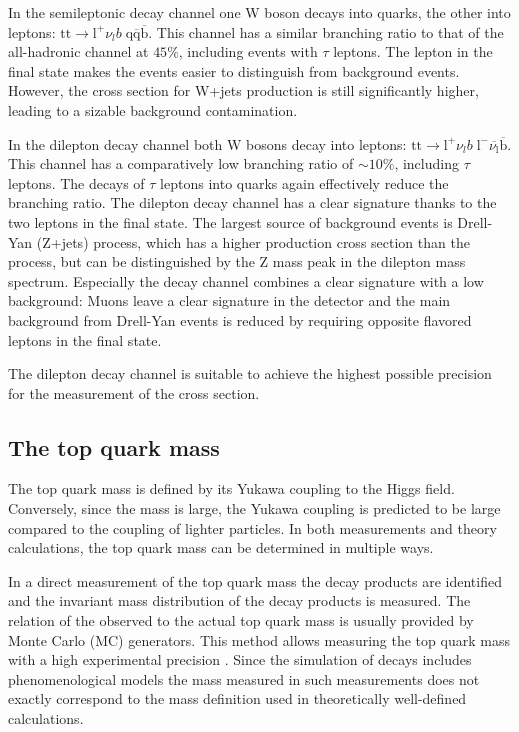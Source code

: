 In the semileptonic decay channel one W boson decays into quarks, the other into leptons: $\mathrm{tt} \rightarrow \mathrm{l}^+ \nu_l b \; \mathrm{q}\overline{\mathrm{q}}\overline{\mathrm{b}}$. This channel has a similar branching ratio to that of the all-hadronic channel at $45\%$, including events with $\tau$ leptons. 
The lepton in the final state makes the events easier to distinguish from background events. However, the cross section for W+jets production is still significantly higher, leading to a sizable background contamination.

In the dilepton decay channel both W bosons decay into leptons: $\mathrm{tt} \rightarrow \mathrm{l}^+ \nu_l b \; \mathrm{l}^- \overline{\nu_\mathrm{l}}\overline{\mathrm{b}}$. This channel has a comparatively low branching ratio of $\sim 10\%$, including $\tau$ leptons. The decays of $\tau$ leptons into quarks again effectively reduce the branching ratio.
The dilepton decay channel has a clear signature thanks to the two leptons in the final state. The largest source of background events is Drell-Yan (Z+jets) process, which has a higher production cross section than the \ttbar process, but can be distinguished by the Z mass peak in the dilepton mass spectrum.
Especially the \emu decay channel combines a clear signature with a low background: Muons leave a clear signature in the detector and the main background from Drell-Yan events is reduced by requiring opposite flavored leptons in the final state.

The dilepton decay channel is suitable to achieve the highest possible precision for the measurement of the \ttbar cross section.

\subsection{The top quark mass}

The top quark mass is defined by its Yukawa coupling to the Higgs field. Conversely, since the mass is large, the Yukawa coupling is predicted to be large compared to the coupling of lighter particles.
In both measurements and theory calculations, the top quark mass can be determined in multiple ways.

In a direct measurement of the top quark mass the decay products are identified and the invariant mass distribution of the decay products is measured. The relation of the observed to the actual top quark mass is usually provided by Monte Carlo (MC) generators.
This method allows measuring the top quark mass with a high experimental precision \cite{ATLAS:2014wva,Khachatryan:2015hba}. Since the simulation of \ttbar decays includes phenomenological models
the mass measured in such measurements does not exactly correspond to the mass definition used in theoretically well-defined calculations.

